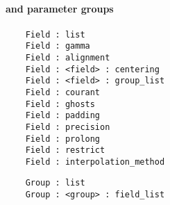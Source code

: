 \NEWSEC

\subsection{\ssParamData}

\begin{frame}[fragile,label=ss-param-data] 
\secframetitle{\ssParamData}
\framesubtitle{ and  parameter groups}

\begin{verbatim}    
    Field : list
    Field : gamma
    Field : alignment
    Field : <field> : centering
    Field : <field> : group_list
    Field : courant
    Field : ghosts
    Field : padding
    Field : precision
    Field : prolong
    Field : restrict
    Field : interpolation_method
\end{verbatim}
    
\begin{verbatim}    
    Group : list
    Group : <group> : field_list
\end{verbatim}
    
\end{frame}

